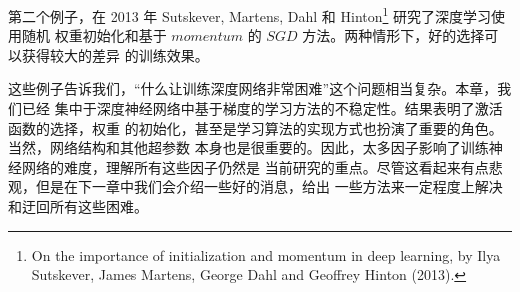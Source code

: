 第二个例子，在 2013 年 Sutskever, Martens, Dahl 和 Hinton\footnote{On the
  importance of initialization and momentum in deep learning, by Ilya Sutskever,
  James Martens, George Dahl and Geoffrey Hinton (2013).} 研究了深度学习使用随机
权重初始化和基于 $momentum$ 的 $SGD$ 方法。两种情形下，好的选择可以获得较大的差异
的训练效果。

这些例子告诉我们，“什么让训练深度网络非常困难”这个问题相当复杂。本章，我们已经
集中于深度神经网络中基于梯度的学习方法的不稳定性。结果表明了激活函数的选择，权重
的初始化，甚至是学习算法的实现方式也扮演了重要的角色。当然，网络结构和其他超参数
本身也是很重要的。因此，太多因子影响了训练神经网络的难度，理解所有这些因子仍然是
当前研究的重点。尽管这看起来有点悲观，但是在下一章中我们会介绍一些好的消息，给出
一些方法来一定程度上解决和迂回所有这些困难。
